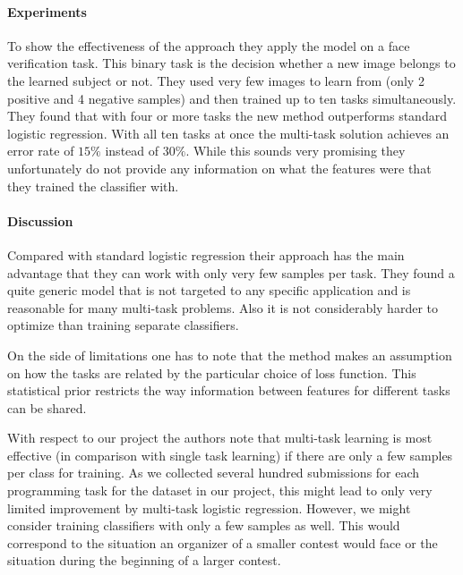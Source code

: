\paragraph{Experiments}
To show the effectiveness of the approach they apply the model on a face verification task. This binary task is the decision whether a new image belongs to the learned subject or not. They used very few images to learn from (only 2 positive and 4 negative samples) and then trained up to ten tasks simultaneously. They found that with four or more tasks the new method outperforms standard logistic regression. With all ten tasks at once the multi-task solution achieves an error rate of $15\%$ instead of $30\%$.
While this sounds very promising they unfortunately do not provide any information on what the features were that they trained the classifier with.

\paragraph{Discussion}
Compared with standard logistic regression their approach has the main advantage that they can work with only very few samples per task. They found a quite generic model that is not targeted to any specific application and is reasonable for many multi-task problems. Also it is not considerably harder to optimize than training separate classifiers.

On the side of limitations one has to note that the method makes an assumption on how the tasks are related by the particular choice of loss function. This statistical prior restricts the way information between features for different tasks can be shared.

With respect to our project the authors note that multi-task learning is most effective (in comparison with single task learning) if there are only a few samples per class for training. As we collected several hundred submissions for each programming task for the dataset in our project, this might lead to only very limited improvement by multi-task logistic regression. However, we might consider training classifiers with only a few samples as well. This would correspond to the situation an organizer of a smaller contest would face or the situation during the beginning of a larger contest.

\newpage